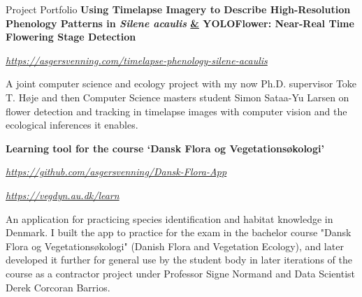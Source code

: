 \begin{rubric}{Project Portfolio}
%
    \textbf{Using Timelapse Imagery to Describe High-Resolution Phenology Patterns in \textit{Silene acaulis} \underline{\&} YOLOFlower: Near-Real Time Flowering Stage Detection}\par
    \href{https://asgersvenning.com/timelapse-phenology-silene-acaulis}{\color{blue}\textit{https://asgersvenning.com/timelapse-phenology-silene-acaulis}}\par
    \pind A joint computer science and ecology project with my now Ph.D. supervisor Toke T. Høje and then Computer Science masters student Simon Sataa-Yu Larsen on flower detection and tracking in timelapse images with computer vision and the ecological inferences it enables.

%
    \textbf{Learning tool for the course ‘Dansk Flora og Vegetationsøkologi’}\par
    \href{https://github.com/asgersvenning/Dansk-Flora-App}{\color{blue}\textit{https://github.com/asgersvenning/Dansk-Flora-App}}\par
    \href{https://vegdyn.au.dk/learn}{\color{SwishLineColour}\textit{https://vegdyn.au.dk/learn}}\par
    \pind An application for practicing species identification and habitat knowledge in Denmark. I built the app to practice for the exam in the bachelor course "Dansk Flora og Vegetationsøkologi" (Danish Flora and Vegetation Ecology), and later developed it further for general use by the student body in later iterations of the course as a contractor project under Professor Signe Normand and Data Scientist Derek Corcoran Barrios.


\end{rubric}